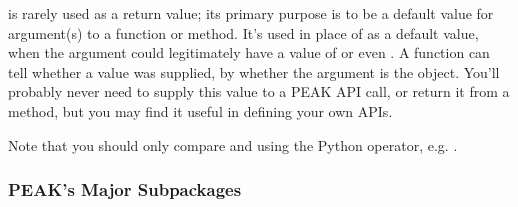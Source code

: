  is rarely used as a return value; its primary purpose is to be
a default value for argument(s) to a function or method.  It's used in place of
 as a default value, when the argument could legitimately have a
value of  or even .  A function can tell whether a
value was supplied, by whether the argument is the  object.
You'll probably never need to supply this value to a PEAK API call, or
return it from a method, but you may find it useful in defining your own APIs.

Note that you should only compare  and  using
the Python  operator, e.g. .

\newpage


\subsubsection{PEAK's Major Subpackages}

